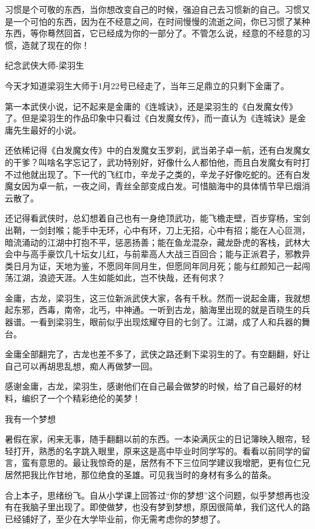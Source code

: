 习惯是个可敬的东西，当你想改变自己的时候，强迫自己去习惯新的自己。习惯又是一个可怕的东西，因为在不经意之间，在时间慢慢的流逝之间，你已习惯了某种东西，等你蓦然回首，它已经成为你的一部分了。不管怎么说，经意的不经意的习惯，造就了现在的你！


纪念武侠大师-梁羽生

今天才知道梁羽生大师于1月22号已经走了，当年三足鼎立的只剩下金庸了。

第一本武侠小说，记不起来是金庸的《连城诀》，还是梁羽生的《白发魔女传》了。但是梁羽生的作品印象中只看过《白发魔女传》，而一直认为《连城诀》是金庸先生最好的小说。

还依稀记得《白发魔女传》中的白发魔女玉罗刹，武当弟子卓一航，还有白发魔女的干爹？叫啥名字忘记了，武功特别好，好像什么人都怕他，而且白发魔女有时打不过他就出现了。下一代的飞红巾，辛龙子之类的，辛龙子好像吃蛇的。还有白发魔女因为卓一航，一夜之间，青丝全部变成白发。可惜脑海中的具体情节早已烟消云散了。

还记得看武侠时，总幻想着自己也有一身绝顶武功，能飞檐走壁，百步穿杨，宝剑出鞘，一剑封喉；能手中无环，心中有环，刀上无招，心中有招；能在人心叵测，暗流涌动的江湖中打抱不平，惩恶扬善；能在鱼龙混杂，藏龙卧虎的客栈，武林大会中与高手豪饮几十坛女儿红，与前辈高人大战三百回合；能与正派君子，邪教异类日月为证，天地为鉴，不愿同年同月生，但愿同年同月死；能与红颜知己一起闯荡江湖，浪迹天涯。人生如能如此，岂不快哉，还有何求？

金庸，古龙，梁羽生，这三位新派武侠大家，各有千秋。然而一说起金庸，我就想起东邪，西毒，南帝，北丐，中神通。一听到古龙，脑海里出现的就是百晓生的兵器谱。一看到梁羽生，眼前似乎出现炫耀夺目的七剑了。江湖，成了人和兵器的舞台。

金庸全部翻完了，古龙也差不多了，武侠之路还剩下梁羽生的了。有空翻翻，好让自己可以再胡思乱想，痴人再做梦一回。

感谢金庸，古龙，梁羽生，感谢他们在自己最会做梦的时候，给了自己最好的材料，编织了一个个精彩绝伦的美梦！


我有一个梦想

暑假在家，闲来无事，随手翻翻以前的东西。一本染满灰尘的日记簿映入眼帘，轻轻打开，熟悉的名字跳入眼里，原来这是高中毕业时同学写的。看看以前同学的留言，蛮有意思的。最让我惊奇的是，居然有不下三位同学建议我增肥，更有位仁兄居然把我比作甘地，那位绝食的圣雄。可见我当时的身材有多么的苗条。

合上本子，思绪纷飞。自从小学课上回答过“你的梦想”这个问题，似乎梦想再也没有在我脑子里出现了。即使做梦，也没有梦到梦想，原因很简单，我们这代人的路已经铺好了，至少在大学毕业前，你无需考虑你的梦想了。


